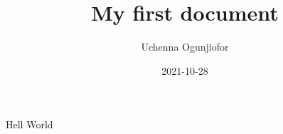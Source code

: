 \documentclass{article}
\title{My first document}
\date{2021-10-28}
\author{Uchenna Ogunjiofor}
\begin{document}
	\maketitle
	\newpage
	Hell World
\end{document}
